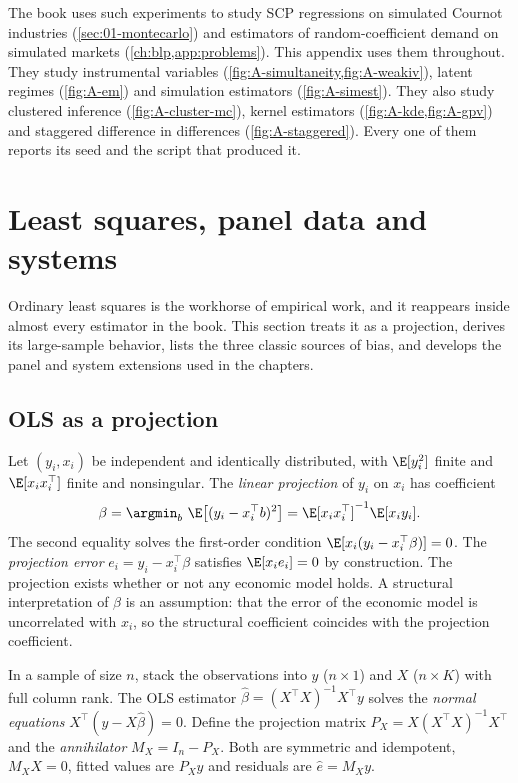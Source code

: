 The book uses such experiments to study SCP regressions on simulated Cournot industries
(\cref{sec:01-montecarlo}) and estimators of random-coefficient demand on simulated markets
(\cref{ch:blp,app:problems}). This appendix uses them throughout. They study instrumental variables
(\cref{fig:A-simultaneity,fig:A-weakiv}), latent regimes (\cref{fig:A-em}) and simulation estimators
(\cref{fig:A-simest}). They also study clustered inference (\cref{fig:A-cluster-mc}), kernel estimators
(\cref{fig:A-kde,fig:A-gpv}) and staggered difference in differences (\cref{fig:A-staggered}). Every one of
them reports its seed and the script that produced it.

\section{Least squares, panel data and systems}\label{sec:A-ols}

Ordinary least squares is the workhorse of empirical work, and it reappears inside almost every estimator
in the book. This section treats it as a projection, derives its large-sample behavior, lists the three
classic sources of bias, and develops the panel and system extensions used in the chapters.

\subsection{OLS as a projection}\label{sec:A-projection}

Let $(y_i, x_i)$ be independent and identically distributed, with $\E[y_i^2]$ finite and
$\E[x_i x_i^\top]$ finite and nonsingular. The \emph{linear projection} of $y_i$ on $x_i$ has coefficient
\begin{equation}\label{eq:A-projection}
\beta = \argmin_{b}\ \E\bigl[(y_i - x_i^\top b)^2\bigr] = \E[x_i x_i^\top]^{-1}\E[x_i y_i] .
\end{equation}
The second equality solves the first-order condition $\E[x_i(y_i - x_i^\top\beta)] = 0$. The
\emph{projection error} $e_i = y_i - x_i^\top\beta$ satisfies $\E[x_i e_i] = 0$ by construction. The
projection exists whether or not any economic model holds. A structural interpretation of $\beta$ is an
assumption: that the error of the economic model is uncorrelated with $x_i$, so the structural coefficient
coincides with the projection coefficient.

In a sample of size $n$, stack the observations into $y$ ($n \times 1$) and $X$ ($n \times K$) with full
column rank. The OLS estimator $\hat\beta = (X^\top X)^{-1}X^\top y$ solves the \emph{normal equations}
$X^\top(y - X\hat\beta) = 0$. Define the projection matrix $P_X = X(X^\top X)^{-1}X^\top$ and the
\emph{annihilator} $M_X = I_n - P_X$. Both are symmetric and idempotent, $M_X X = 0$, fitted values are
$P_X y$ and residuals are $\hat e = M_X y$.

